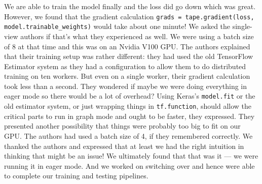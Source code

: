 
We are able to train the model finally and the loss did go down which was great. However, we found that the gradient calculation \texttt{grads = tape.gradient(loss, model.trainable\_weights)} would take about one minute! We asked the single-view authors if that's what they experienced as well. We were using a batch size of 8 at that time and this was on an Nvidia V100 GPU. The authors explained that their training setup was rather different: they had used the old TensorFlow Estimator system as they had a configuration to allow them to do distributed training on ten workers. But even on a single worker, their gradient calculation took less than a second. They wondered if maybe we were doing everything in eager mode so there would be a lot of overhead? Using Keras's \texttt{model.fit} or the old estimator system, or just wrapping things in \texttt{tf.function}, should allow the critical parts to run in graph mode and ought to be faster, they expressed. They presented another possibility that things were probably too big to fit on our GPU. The authors had used a batch size of 4, if they remembered correctly. We thanked the authors and expressed that at least we had the right intuition in thinking that might be an issue! We ultimately found that that was it --- we were running it in eager mode. And we worked on switching over and hence were able to complete our training and testing pipelines.












